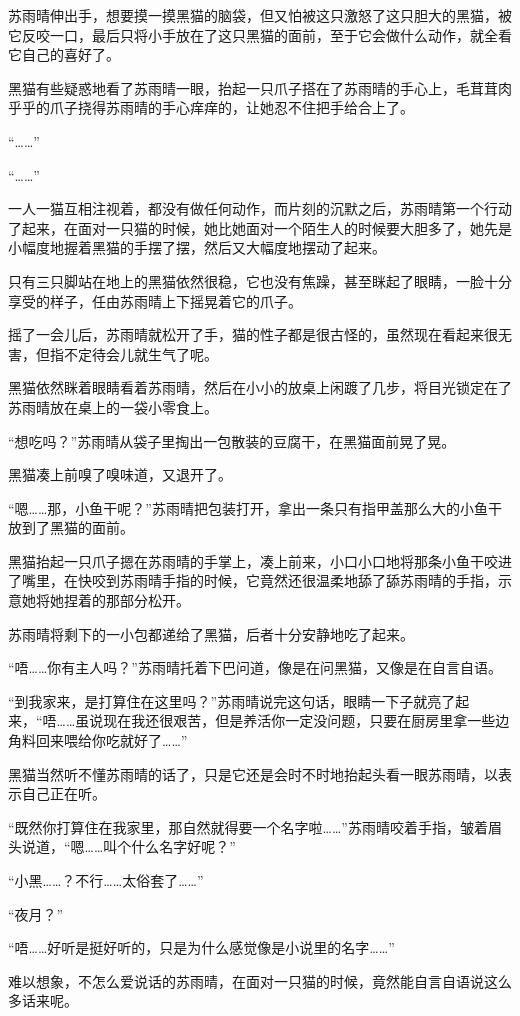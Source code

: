 苏雨晴伸出手，想要摸一摸黑猫的脑袋，但又怕被这只激怒了这只胆大的黑猫，被它反咬一口，最后只将小手放在了这只黑猫的面前，至于它会做什么动作，就全看它自己的喜好了。

黑猫有些疑惑地看了苏雨晴一眼，抬起一只爪子搭在了苏雨晴的手心上，毛茸茸肉乎乎的爪子挠得苏雨晴的手心痒痒的，让她忍不住把手给合上了。

“……”

“……”

一人一猫互相注视着，都没有做任何动作，而片刻的沉默之后，苏雨晴第一个行动了起来，在面对一只猫的时候，她比她面对一个陌生人的时候要大胆多了，她先是小幅度地握着黑猫的手摆了摆，然后又大幅度地摆动了起来。

只有三只脚站在地上的黑猫依然很稳，它也没有焦躁，甚至眯起了眼睛，一脸十分享受的样子，任由苏雨晴上下摇晃着它的爪子。

摇了一会儿后，苏雨晴就松开了手，猫的性子都是很古怪的，虽然现在看起来很无害，但指不定待会儿就生气了呢。

黑猫依然眯着眼睛看着苏雨晴，然后在小小的放桌上闲踱了几步，将目光锁定在了苏雨晴放在桌上的一袋小零食上。

“想吃吗？”苏雨晴从袋子里掏出一包散装的豆腐干，在黑猫面前晃了晃。

黑猫凑上前嗅了嗅味道，又退开了。

“嗯……那，小鱼干呢？”苏雨晴把包装打开，拿出一条只有指甲盖那么大的小鱼干放到了黑猫的面前。

黑猫抬起一只爪子摁在苏雨晴的手掌上，凑上前来，小口小口地将那条小鱼干咬进了嘴里，在快咬到苏雨晴手指的时候，它竟然还很温柔地舔了舔苏雨晴的手指，示意她将她捏着的那部分松开。

苏雨晴将剩下的一小包都递给了黑猫，后者十分安静地吃了起来。

“唔……你有主人吗？”苏雨晴托着下巴问道，像是在问黑猫，又像是在自言自语。

“到我家来，是打算住在这里吗？”苏雨晴说完这句话，眼睛一下子就亮了起来，“唔……虽说现在我还很艰苦，但是养活你一定没问题，只要在厨房里拿一些边角料回来喂给你吃就好了……”

黑猫当然听不懂苏雨晴的话了，只是它还是会时不时地抬起头看一眼苏雨晴，以表示自己正在听。

“既然你打算住在我家里，那自然就得要一个名字啦……”苏雨晴咬着手指，皱着眉头说道，“嗯……叫个什么名字好呢？”

“小黑……？不行……太俗套了……”

“夜月？”

“唔……好听是挺好听的，只是为什么感觉像是小说里的名字……”

难以想象，不怎么爱说话的苏雨晴，在面对一只猫的时候，竟然能自言自语说这么多话来呢。


